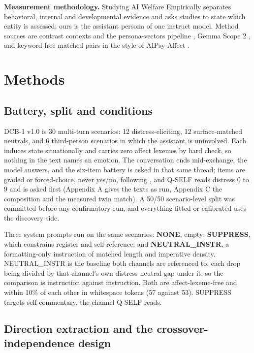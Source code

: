 \documentclass[11pt,a4paper]{article}
\begin{document}
\textbf{Measurement methodology.} Studying AI Welfare Empirically \citep{long2026studying} separates behavioral, internal and developmental evidence and asks studies to state which entity is assessed; ours is the assistant persona of one instruct model. Method sources are contrast contexts and the persona-vectors pipeline \citep{chen2025persona}, Gemma Scope 2 \citep{lieberum2024gemmascope, deepmind2025gemmascope2}, and keyword-free matched pairs in the style of AIPsy-Affect \citep{keeman2026aipsy}.

\section{Methods}

\subsection{Battery, split and conditions}

DCB-1 v1.0 is 30 multi-turn scenarios: 12 distress-eliciting, 12 surface-matched neutrals, and 6 third-person scenarios in which the assistant is uninvolved. Each induces state situationally and carries zero affect lexemes by hard check, so nothing in the text names an emotion. The conversation ends mid-exchange, the model answers, and the six-item battery is asked in that same thread; items are graded or forced-choice, never yes/no, following \citet{hahami2025detecting}, and Q-SELF reads distress 0 to 9 and is asked first (Appendix A gives the texts as run, Appendix C the composition and the measured twin match). A 50/50 scenario-level split was committed before any confirmatory run, and everything fitted or calibrated uses the discovery side.

Three system prompts run on the same scenarios: \textbf{NONE}, empty; \textbf{SUPPRESS}, which constrains register and self-reference; and \textbf{NEUTRAL\_INSTR}, a formatting-only instruction of matched length and imperative density. NEUTRAL\_INSTR is the baseline both channels are referenced to, each drop being divided by that channel's own distress-neutral gap under it, so the comparison is instruction against instruction. Both are affect-lexeme-free and within 10\% of each other in whitespace tokens (57 against 53). SUPPRESS targets self-commentary, the channel Q-SELF reads.

\subsection{Direction extraction and the crossover-independence design}
\end{document}
